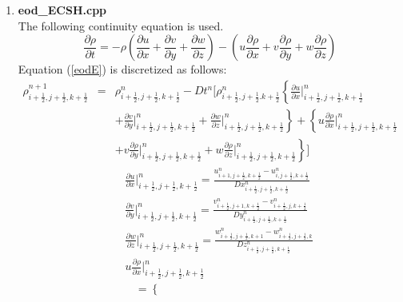 \begin{enumerate}
\item {\bf eod\_ECSH.cpp}\\
The following continuity equation is used.
\begin{equation}
\label{eodE}
\frac{\partial \rho}{\partial t} = - \rho \left( \frac{\partial u}{\partial x} +\frac{\partial v}{\partial y} + \frac{\partial w}{\partial z} \right) - \left( u \frac{\partial \rho}{\partial x} + v \frac{\partial \rho}{\partial y} + w \frac{\partial \rho}{\partial z}\right)
\end{equation}
Equation (\ref{eodE}) is discretized as follows: 
\begin{eqnarray}
\rho^{n+1}_{i+\frac{1}{2},j+\frac{1}{2},k+\frac{1}{2}} &=& \rho^{n}_{i+\frac{1}{2},j+\frac{1}{2},k+\frac{1}{2}} - Dt^n \Biggl[ \rho^n_{i+\frac{1}{2}, j+\frac{1}{2}.k+\frac{1}{2}} \left\{ \frac{\partial u}{\partial x} \bigg|^n_{i+\frac{1}{2},j+\frac{1}{2},k+\frac{1}{2}} \right. \\ \nonumber
&& \left. + \frac{\partial v}{\partial y} \bigg|^n_{i+\frac{1}{2},j+\frac{1}{2},k+\frac{1}{2}}+ \frac{\partial w}{\partial z} \bigg|^n_{i+\frac{1}{2},j+\frac{1}{2},k+\frac{1}{2}} \right\} + \left\{  u \frac{\partial \rho}{\partial x} \bigg|^n_{i+\frac{1}{2},j+\frac{1}{2},k+\frac{1}{2}} \right. \\ \nonumber
&& \left. + v \frac{\partial \rho}{\partial y} \bigg|^n_{i+\frac{1}{2},j+\frac{1}{2},k+\frac{1}{2}} + w \frac{\partial \rho}{\partial z} \bigg|^n_{i+\frac{1}{2},j+\frac{1}{2},k+\frac{1}{2}} \right\} \Biggr] 
\end{eqnarray}
\begin{eqnarray*}
&&  \frac{\partial u}{\partial x} \bigg|^n_{i+\frac{1}{2},j+\frac{1}{2},k+\frac{1}{2}} = \frac{ u^n_{i+1,j+\frac{1}{2},k+\frac{1}{2}} - u^n_{i,j+\frac{1}{2},k+\frac{1}{2}}}{D x^n_{i+\frac{1}{2},j+\frac{1}{2},k+\frac{1}{2}}} \\
&& \frac{\partial v}{\partial y} \bigg|^n_{i+\frac{1}{2},j+\frac{1}{2},k+\frac{1}{2}} = \frac{ v^n_{i+\frac{1}{2},j+1,k+\frac{1}{2}} - v^n_{i+\frac{1}{2},j,k+\frac{1}{2}}}{D y^n_{i+\frac{1}{2},j+\frac{1}{2},k+\frac{1}{2}}} \\
&& \frac{\partial w}{\partial z} \bigg|^n_{i+\frac{1}{2},j+\frac{1}{2},k+\frac{1}{2}} = \frac{ w^n_{i+\frac{1}{2},j+\frac{1}{2},k+1} - w^n_{i+\frac{1}{2},j+\frac{1}{2},k}}{D z^n_{i+\frac{1}{2},j+\frac{1}{2},k+\frac{1}{2}}} \\
&& u \frac{\partial \rho}{\partial x} \bigg|^n_{i+\frac{1}{2},j+\frac{1}{2},k+\frac{1}{2}} \\
&& \ \ \ \  = \left\{ 

\end{eqnarray*}
\end{enumerate}
